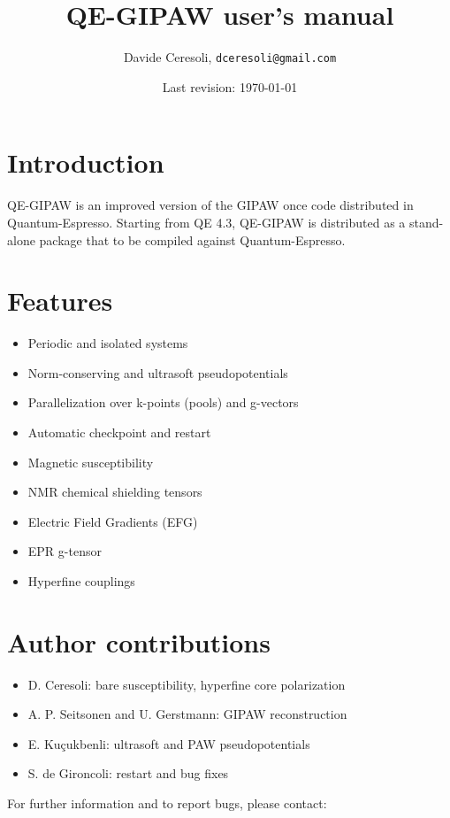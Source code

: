 \documentclass[a4paper,11pt,twoside]{article}
\title{QE-GIPAW user's manual}
\author{Davide Ceresoli, \texttt{dceresoli@gmail.com}}
\date{Last revision: \today}
\begin{document}
\maketitle
\thispagestyle{empty}

\section{Introduction}
QE-GIPAW is an improved version of the GIPAW once code distributed in
Quantum-Espresso. Starting from QE 4.3, QE-GIPAW is distributed as a
stand-alone package that to be compiled against Quantum-Espresso.

\section{Features}
\begin{itemize}
  \item Periodic and isolated systems
  \item Norm-conserving and ultrasoft pseudopotentials
  \item Parallelization over k-points (pools) and g-vectors
  \item Automatic checkpoint and restart
  \item Magnetic susceptibility
  \item NMR chemical shielding tensors~\cite{pickard01,yates07}
  \item Electric Field Gradients (EFG)
  \item EPR g-tensor~\cite{pickard02}
  \item Hyperfine couplings
\end{itemize}

\section{Author contributions}
\begin{itemize}
  \item D. Ceresoli: bare susceptibility, hyperfine core polarization
  \item A. P. Seitsonen and U. Gerstmann: GIPAW reconstruction 
  \item E. Kuçukbenli: ultrasoft and PAW pseudopotentials 
  \item S. de Gironcoli: restart and bug fixes 
\end{itemize}
For further information and to report bugs, please contact:
\end{document}
